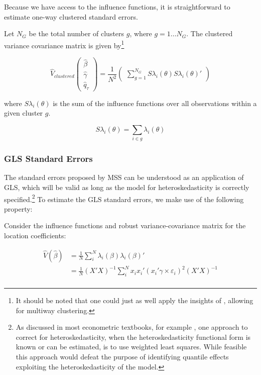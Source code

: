\documentclass[
  authoryear,
  review,
  1p]{elsarticle}
\begin{document}
Because we have access to the influence functions, it is straightforward
to estimate one-way clustered standard errors.

Let \(N_G\) be the total number of clusters \(g\), where
\(g=1\dots N_G\). The clustered variance covariance matrix is given
by\footnote{It should be noted that one could just as well apply the
  insights of \citet{cameron_robust_2011}, allowing for multiway
  clustering.}

\[\hat{V}_{clustered}
  \begin{pmatrix}
  \hat\beta \\
  \hat\gamma \\
  \hat q_\tau
  \end{pmatrix}
 = \frac{1}{N^2} 
 \begin{pmatrix}
 \sum_{g=1}^{N_G} S\lambda_i(\theta) S\lambda_i(\theta)'
  \end{pmatrix}
\]

where \(S\lambda_i(\theta)\) is the sum of the influence functions over
all observations within a given cluster \(g\).

\[S\lambda_i(\theta) = \sum_{i\in g} \lambda_i(\theta)
\]

\subsubsection{GLS Standard Errors}\label{sec-gls}

The standard errors proposed by MSS can be understood as an application
of GLS, which will be valid as long as the model for heteroskedasticity
is correctly specified.\footnote{As discussed in most econometric
  textbooks, for example \citet{cameron2005}, one approach to correct
  for heteroskedasticity, when the heteroskedasticity functional form is
  known or can be estimated, is to use weighted least squares. While
  feasible this approach would defeat the purpose of identifying
  quantile effects exploiting the heteroskedasticity of the model.} To
estimate the GLS standard errors, we make use of the following property:

Consider the influence functions and robust variance-covariance matrix
for the location coefficients:

\[\begin{aligned}
\hat V(\hat \beta) &= \frac{1}{N} \sum_i^N \lambda_{i}(\beta) \lambda_{i}(\beta)' \\
&= \frac{1}{N}  (X'X)^{-1}  \sum_i^N x_i x_i' ( x_i'\gamma \times \varepsilon_i)^2 (X'X)^{-1} \\
\end{aligned}
\]
\end{document}
